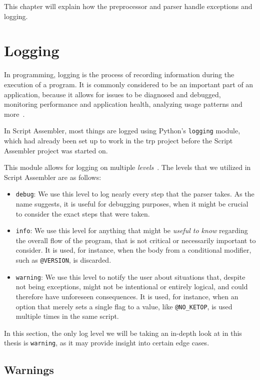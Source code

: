 
This chapter will explain how the preprocessor and parser handle exceptions and logging. 

\section{Logging}

In programming, logging is the process of recording information during the execution of a program. It is commonly considered to be an important part of an application, because it allows for issues to be diagnosed and debugged, monitoring performance and application health, analyzing usage patterns and more~\cite{logging}.

In Script Assembler, most things are logged using Python's \verb|logging| module, which had already been set up to work in the \gls{trp} project before the Script Assembler project was started on. 

This module allows for logging on multiple \textit{levels}~\cite{py-logging}. The levels that we utilized in Script Assembler are as follows:

\begin{itemize}
    \item \verb|debug|: We use this level to log nearly every step that the parser takes. As the name suggests, it is useful for debugging purposes, when it might be crucial to consider the exact steps that were taken.
    \item \verb|info|: We use this level for anything that might be \textit{useful to know} regarding the overall flow of the program, that is not critical or necessarily important to consider. It is used, for instance, when the body from a conditional modifier, such as \verb|@VERSION|, is discarded.
    \item \verb|warning|: We use this level to notify the user about situations that, despite not being exceptions, might not be intentional or entirely logical, and could therefore have unforeseen consequences. It is used, for instance, when an option that merely sets a single flag to a value, like \verb|@NO_KETOP|, is used multiple times in the same script. 
\end{itemize}

In this section, the only log level we will be taking an in-depth look at in this thesis is \verb|warning|, as it may provide insight into certain edge cases. 

\subsection{Warnings}

